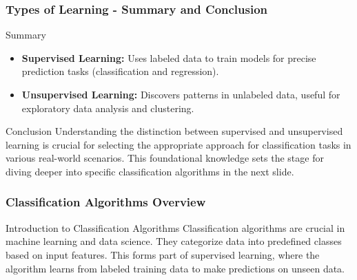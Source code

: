 \documentclass[aspectratio=169]{beamer}
\begin{document}
\begin{frame}[fragile]
    \frametitle{Types of Learning - Summary and Conclusion}
    \begin{block}{Summary}
        \begin{itemize}
            \item \textbf{Supervised Learning:} Uses labeled data to train models for precise prediction tasks (classification and regression).
            \item \textbf{Unsupervised Learning:} Discovers patterns in unlabeled data, useful for exploratory data analysis and clustering.
        \end{itemize}
    \end{block}
    \begin{block}{Conclusion}
        Understanding the distinction between supervised and unsupervised learning is crucial for selecting the appropriate approach for classification tasks in various real-world scenarios. This foundational knowledge sets the stage for diving deeper into specific classification algorithms in the next slide.
    \end{block}
\end{frame}

\begin{frame}[fragile]
    \frametitle{Classification Algorithms Overview}
    \begin{block}{Introduction to Classification Algorithms}
        Classification algorithms are crucial in machine learning and data science. They categorize data into predefined classes based on input features. This forms part of supervised learning, where the algorithm learns from labeled training data to make predictions on unseen data.
    \end{block}
\end{frame}
\end{document}
